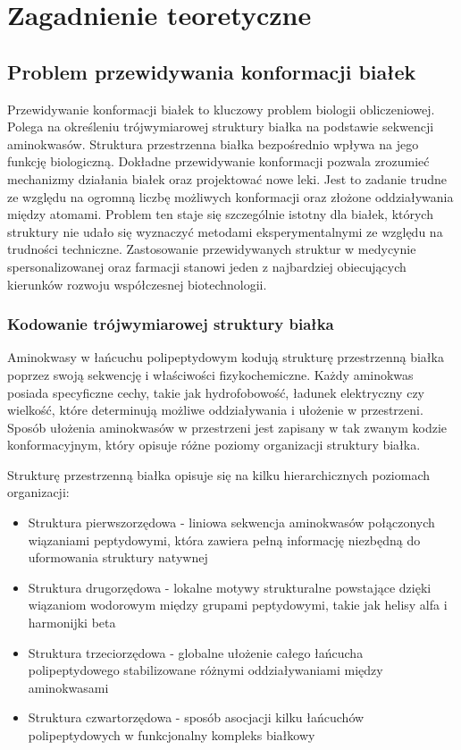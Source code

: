 \chapter{Zagadnienie teoretyczne}


\section{Problem przewidywania konformacji białek}
Przewidywanie konformacji białek to kluczowy problem biologii obliczeniowej.
Polega na określeniu trójwymiarowej struktury białka na podstawie sekwencji aminokwasów.
Struktura przestrzenna białka bezpośrednio wpływa na jego funkcję biologiczną.
Dokładne przewidywanie konformacji pozwala zrozumieć mechanizmy działania białek oraz projektować nowe leki.
Jest to zadanie trudne ze względu na ogromną liczbę możliwych konformacji oraz złożone oddziaływania między atomami.
Problem ten staje się szczególnie istotny dla białek, których struktury nie udało się wyznaczyć metodami eksperymentalnymi ze względu na trudności techniczne.
Zastosowanie przewidywanych struktur w medycynie spersonalizowanej oraz farmacji stanowi jeden z najbardziej obiecujących kierunków rozwoju współczesnej biotechnologii.

\subsection{Kodowanie trójwymiarowej struktury białka}
Aminokwasy w łańcuchu polipeptydowym kodują strukturę przestrzenną białka poprzez swoją sekwencję i właściwości fizykochemiczne.
Każdy aminokwas posiada specyficzne cechy, takie jak hydrofobowość, ładunek elektryczny czy wielkość, które determinują możliwe oddziaływania i ułożenie w przestrzeni.
Sposób ułożenia aminokwasów w przestrzeni jest zapisany w tak zwanym kodzie konformacyjnym, który opisuje różne poziomy organizacji struktury białka.

Strukturę przestrzenną białka opisuje się na kilku hierarchicznych poziomach organizacji:

\begin{itemize}
    \item Struktura pierwszorzędowa - liniowa sekwencja aminokwasów połączonych wiązaniami peptydowymi, która zawiera pełną informację niezbędną do uformowania struktury natywnej
    \item Struktura drugorzędowa - lokalne motywy strukturalne powstające dzięki wiązaniom wodorowym między grupami peptydowymi, takie jak helisy alfa i harmonijki beta
    \item Struktura trzeciorzędowa - globalne ułożenie całego łańcucha polipeptydowego stabilizowane różnymi oddziaływaniami między aminokwasami
    \item Struktura czwartorzędowa - sposób asocjacji kilku łańcuchów polipeptydowych w funkcjonalny kompleks białkowy
\end{itemize}


